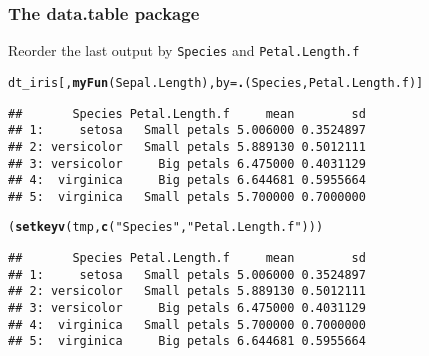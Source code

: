\documentclass[paper=screen,mathserif]{beamer}\usepackage[]{graphicx}\usepackage[]{color}
\makeatletter
\newcommand{\hlstr}[1]{\textcolor[rgb]{0.192,0.494,0.8}{#1}}%
\newcommand{\hlstd}[1]{\textcolor[rgb]{0.345,0.345,0.345}{#1}}%
\newcommand{\hlkwc}[1]{\textcolor[rgb]{0.333,0.667,0.333}{#1}}%
\newcommand{\hlkwd}[1]{\textcolor[rgb]{0.737,0.353,0.396}{\textbf{#1}}}%
\newenvironment{kframe}{%
 \def\at@end@of@kframe{}%
 \ifinner\ifhmode%
  \def\at@end@of@kframe{\end{minipage}}%
  \begin{minipage}{\columnwidth}%
 \fi\fi%
 \def\FrameCommand##1{\hskip\@totalleftmargin \hskip-\fboxsep
 \colorbox{shadecolor}{##1}\hskip-\fboxsep
     \hskip-\linewidth \hskip-\@totalleftmargin \hskip\columnwidth}%
 \MakeFramed {\advance\hsize-\width
   \@totalleftmargin\z@ \linewidth\hsize
   \@setminipage}}%
 {\par\unskip\endMakeFramed%
 \at@end@of@kframe}
\newenvironment{knitrout}{}{} %
\newcommand{\ft}[1]{\frametitle{#1}}
\makeatother
\begin{document}
\begin{frame}[fragile]
  \ft{The {\bf data.table} package}

  Reorder the last output by {\tt Species} and {\tt Petal.Length.f}

\begin{knitrout}\scriptsize
{}\color{fgcolor}\begin{kframe}
\begin{alltt}
\hlstd{dt_iris[,} \hlkwd{myFun}\hlstd{(Sepal.Length),} \hlkwc{by} \hlstd{=} \hlkwd{.}\hlstd{(Species, Petal.Length.f)]}
\end{alltt}
\begin{verbatim}
##       Species Petal.Length.f     mean        sd
## 1:     setosa   Small petals 5.006000 0.3524897
## 2: versicolor   Small petals 5.889130 0.5012111
## 3: versicolor     Big petals 6.475000 0.4031129
## 4:  virginica     Big petals 6.644681 0.5955664
## 5:  virginica   Small petals 5.700000 0.7000000
\end{verbatim}
\begin{alltt}
\hlstd{(}\hlkwd{setkeyv}\hlstd{(tmp,} \hlkwd{c}\hlstd{(}\hlstr{"Species"}\hlstd{,} \hlstr{"Petal.Length.f"}\hlstd{)))}
\end{alltt}
\begin{verbatim}
##       Species Petal.Length.f     mean        sd
## 1:     setosa   Small petals 5.006000 0.3524897
## 2: versicolor   Small petals 5.889130 0.5012111
## 3: versicolor     Big petals 6.475000 0.4031129
## 4:  virginica   Small petals 5.700000 0.7000000
## 5:  virginica     Big petals 6.644681 0.5955664
\end{verbatim}
\end{kframe}
\end{knitrout}
\end{frame}
\end{document}
